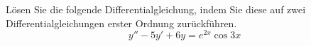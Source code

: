 \begin{atiTask}[
  title = Lösungsmethode der inhomogenen Differentialgleichung 2.Ordnung
]
  Lösen Sie die folgende Differentialgleichung, indem Sie diese auf zwei Differentialgleichungen erster Ordnung zurückführen.
  \[
    y'' - 5y' + 6y = e^{2x} \cos 3x
  \]
\end{atiTask}